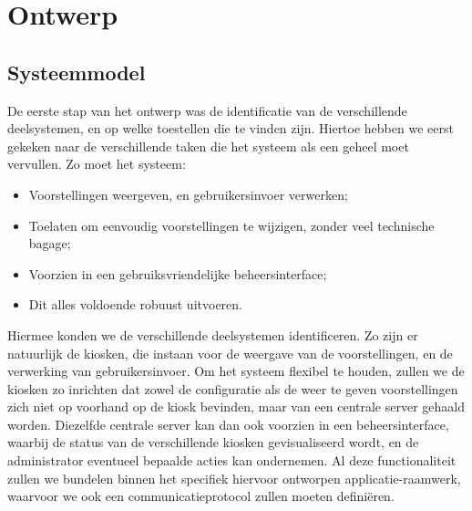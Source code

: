 \part{Ontwerp}
\label{ontwerp}

%
%

\chapter{Systeemmodel}
\label{ontwerp:systeemmodel}

De eerste stap van het ontwerp was de identificatie van de verschillende deelsystemen, en op welke toestellen die te vinden zijn. Hiertoe hebben we eerst gekeken naar de verschillende taken die het systeem als een geheel moet vervullen. Zo moet het systeem:
\begin{itemize}
\item Voorstellingen weergeven, en gebruikersinvoer verwerken;
\item Toelaten om eenvoudig voorstellingen te wijzigen, zonder veel technische bagage;
\item Voorzien in een gebruiksvriendelijke beheersinterface;
\item Dit alles voldoende robuust uitvoeren.
\end{itemize}

Hiermee konden we de verschillende deelsystemen identificeren. Zo zijn er natuurlijk de kiosken, die instaan voor de weergave van de voorstellingen, en de verwerking van gebruikersinvoer. Om het systeem flexibel te houden, zullen we de kiosken zo inrichten dat zowel de configuratie als de weer te geven voorstellingen zich niet op voorhand op de kiosk bevinden, maar van een centrale server gehaald worden. Diezelfde centrale server kan dan ook voorzien in een beheersinterface, waarbij de status van de verschillende kiosken gevisualiseerd wordt, en de administrator eventueel bepaalde acties kan ondernemen. Al deze functionaliteit zullen we bundelen binnen het specifiek hiervoor ontworpen applicatie-raamwerk, waarvoor we ook een communicatieprotocol zullen moeten definiëren.

